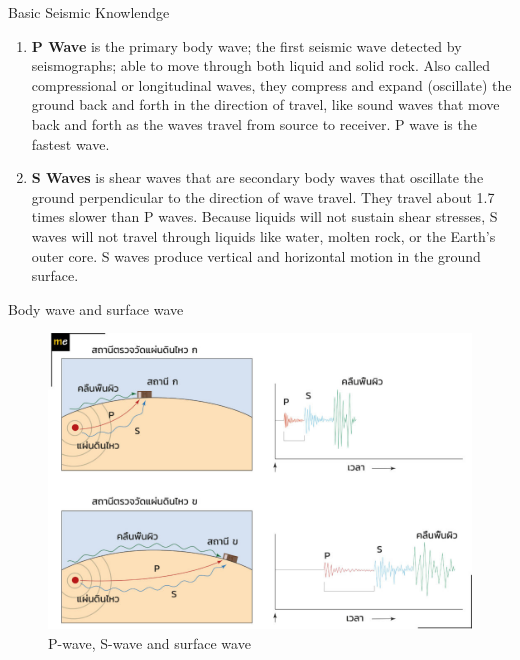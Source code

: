\documentclass{beamer}
\newcounter{saveenumi}
\newcommand{\seti}{\setcounter{saveenumi}{\value{enumi}}}
\newcommand{\conti}{\setcounter{enumi}{\value{saveenumi}}}
\begin{document}
	\begin{frame}[t]{Basic Seismic Knowlendge}
		\begin{enumerate}
			\conti
			\item \textbf{P Wave} is the primary body wave; the first seismic wave detected by 
			seismographs; able to move through both liquid and solid rock. Also called compressional or 
			longitudinal waves, they compress and expand (oscillate) the ground back and forth in the 
			direction of travel, like sound waves that move back and forth as the waves travel from source 
			to receiver. P wave is the fastest wave.
			
			\item \textbf{S Waves} is shear waves that are secondary body waves that oscillate the ground 
			perpendicular to the direction of wave travel. They travel about 1.7 times slower than P waves. 
			Because liquids will not sustain shear stresses, S waves will not travel through liquids like water, 
			molten rock, or the Earth’s outer core. S waves produce vertical and horizontal motion in the 
			ground surface. 
			\seti
		\end{enumerate}
	\end{frame}

	\begin{frame}[t]{Body wave and surface wave}
		\begin{figure}
			\centering
			\includegraphics[scale=0.8]{station.jpg}
			\caption{P-wave, S-wave and surface wave}
		\end{figure}
	\end{frame}
\end{document}
